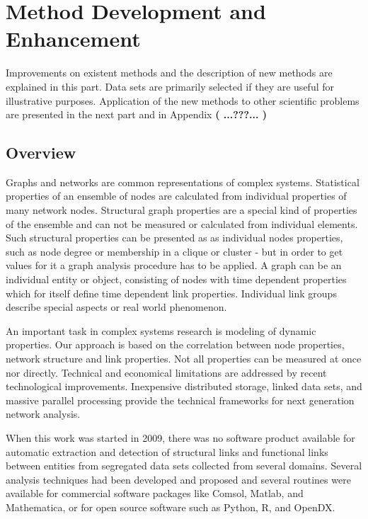 \documentclass[a4paper,10pt]{scrbook}
\begin{document}
\newpage
\clearpage

\part{Method Development and Enhancement}
Improvements on existent methods and the description of new methods are explained in this part. Data sets are primarily selected if they are useful for illustrative purposes. Application of the new methods to other scientific problems are presented in the next part and in Appendix \textbf{( ...???... )} 
\chapter*{Overview}

Graphs and networks are common representations of complex systems. Statistical properties of an ensemble of nodes are calculated from individual properties of many network nodes. Structural graph properties are a special kind of properties of the ensemble and can not be measured or calculated from individual elements. Such structural properties can be presented as as individual nodes properties, such as node degree or  membership in a clique or cluster - but in order to get values for it a graph analysis procedure has to be applied. A graph can be an individual entity or object, consisting of nodes with time dependent properties which for itself define time dependent link properties. Individual link groups describe special aspects or real world phenomenon. 

An important task in complex systems research is modeling of dynamic properties. 
Our approach is based on the correlation between node properties, network structure and link properties. Not all properties can be measured at once nor directly. Technical and economical limitations are addressed by recent technological improvements. Inexpensive distributed storage, linked data sets, and massive parallel processing provide the technical frameworks for next generation network analysis.  

When this work was started in 2009, there was no software product available for automatic extraction and detection of structural links and functional links between entities from segregated data sets collected from several domains. Several analysis techniques had been developed and proposed and several routines were available for commercial software packages like Comsol, Matlab, and Mathematica, or for open source software such as Python, R, and OpenDX. 
\end{document}
